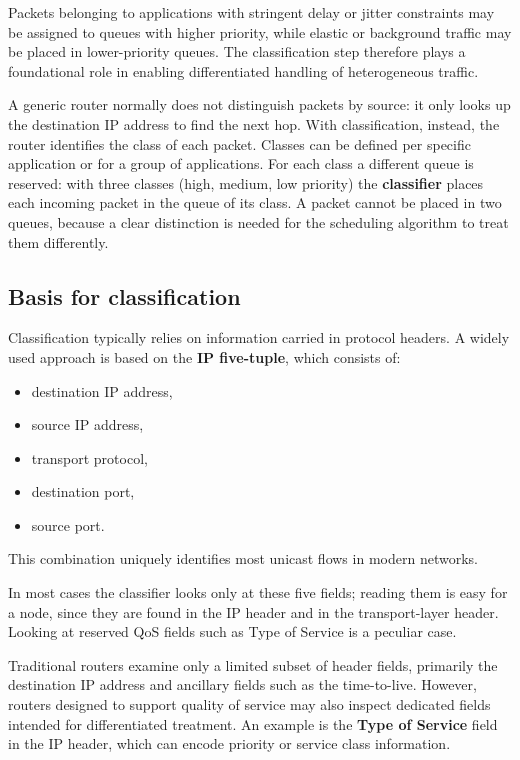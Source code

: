 \documentclass[11pt,a4paper,openany]{report}
\begin{document}
Packets belonging to applications with stringent delay or jitter constraints may be assigned to queues with higher priority, while elastic or background traffic may be placed in lower-priority queues. The classification step therefore plays a foundational role in enabling differentiated handling of heterogeneous traffic.

A generic router normally does not distinguish packets by source: it only looks up the destination IP address to find the next hop. With classification, instead, the router identifies the class of each packet. Classes can be defined per specific application or for a group of applications. For each class a different queue is reserved: with three classes (high, medium, low priority) the \textbf{classifier} places each incoming packet in the queue of its class. A packet cannot be placed in two queues, because a clear distinction is needed for the scheduling algorithm to treat them differently.

\subsection{Basis for classification}

Classification typically relies on information carried in protocol headers. A widely used approach is based on the \textbf{IP five-tuple}, which consists of:

\begin{itemize}
\item destination IP address,
\item source IP address,
\item transport protocol,
\item destination port,
\item source port.
\end{itemize}

This combination uniquely identifies most unicast flows in modern networks.

In most cases the classifier looks only at these five fields; reading them is easy for a node, since they are found in the IP header and in the transport-layer header. Looking at reserved QoS fields such as Type of Service is a peculiar case.

Traditional routers examine only a limited subset of header fields, primarily the destination IP address and ancillary fields such as the time-to-live. However, routers designed to support quality of service may also inspect dedicated fields intended for differentiated treatment. An example is the \textbf{Type of Service} field in the IP header, which can encode priority or service class information.
\end{document}
